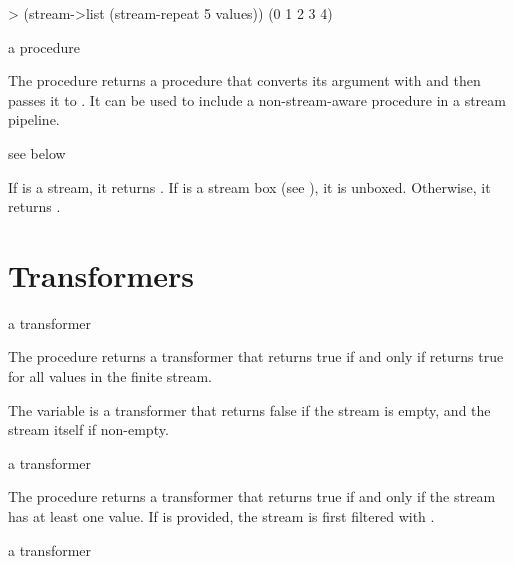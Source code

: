 \codebegin
> (stream->list (stream-repeat 5 values))
(0 1 2 3 4)
\codeend

\begin{procedure}
\end{procedure}
\returns{} a procedure

The  procedure returns a procedure that converts its argument with
 and then passes it to . It can be used to include a
non-stream-aware procedure in a stream pipeline.

\begin{procedure}
\end{procedure}
\returns{} see below

If  is a stream, it returns . If  is a stream
box (see ), it is unboxed. Otherwise, it returns .

\section {Transformers}

\begin{procedure}
\end{procedure}
\returns{} a transformer

The  procedure returns a transformer that returns true if and only if
 returns true for all values in the finite stream.

\begin{variable}
\end{variable}
\antipar

The  variable is a transformer that returns false if the stream is empty, and
the stream itself if non-empty.

\begin{procedure}
\end{procedure}
\returns{} a transformer

The  procedure returns a transformer that returns true if and only if the
stream has at least one value. If  is provided, the stream is first
filtered with .

\begin{procedure}
\end{procedure}
\returns{} a transformer


